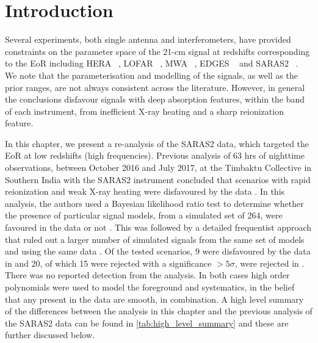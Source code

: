 \section{Introduction}
\label{sec:intro_saras2}

Several experiments, both single antenna and interferometers, have provided constraints on the parameter space of the 21-cm signal at redshifts corresponding to the EoR including HERA~ \citep{HERA_2022b}, LOFAR ~\citep{Ghara_LOFAR_2020, Mondal_LOFAR_2020, Greig_LOFAR_2021}, MWA ~\citep{Greig_MWA_2020, Ghara_MWA_2021}, EDGES ~\citep{Monsalve_EDGES_HB_1_2017, Monsalve_EDGES_HB_2_2018, Monsalve_EDGES_HB_3_2019} and SARAS2 ~\citep{Singh_saras2_2017, Singh_saras2_2018}.
We note that the parameterisation and modelling of the signals, as well as the prior ranges, are not always consistent across the literature. However, in general the conclusions disfavour signals with deep absorption features, within the band of each instrument, from inefficient X-ray heating and a sharp reionization feature.

In this chapter, we present a re-analysis of the SARAS2 data, which targeted the EoR at low redshifts (high frequencies). Previous analysis of 63 hrs of nighttime observations, between October 2016 and July 2017, at the Timbaktu Collective in Southern India with the SARAS2 instrument concluded that scenarios with rapid reionization and weak X-ray heating were disfavoured by the data \citep[][]{Singh_saras2_2017, Singh_saras2_2018}. In this analysis, the authors used a Bayesian likelihood ratio test to determine whether the presence of particular signal models, from a simulated set of 264, were favoured in the data or not \citep{Singh_saras2_2017}. This was followed by a detailed frequentist approach that ruled out a larger number of simulated signals from the same set of models and using the same data \citep{Singh_saras2_2018}. Of the tested scenarios, 9 were disfavoured by the data in \cite{Singh_saras2_2017} and 20, of which 15 were rejected with a significance $> 5\sigma$, were rejected in \cite{Singh_saras2_2018}. There was no reported detection from the analysis. In both cases high order polynomials were used to model the foreground and systematics, in the belief that any present in the data are smooth, in combination. A high level summary of the differences between the analysis in this chapter and the previous analysis of the SARAS2 data can be found in \cref{tab:high_level_summary} and these are further discussed below.

